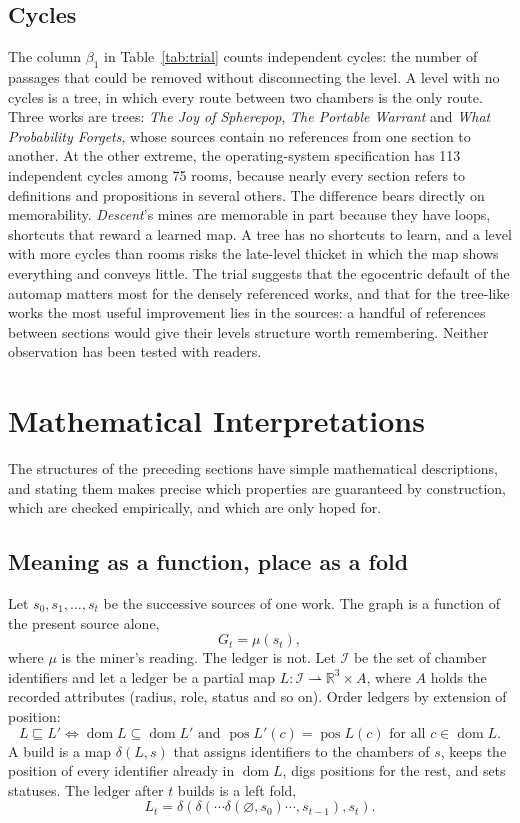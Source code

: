 \documentclass[11pt]{article}
\theoremstyle{remark}
\begin{document}
\subsection{Cycles}

The column $\beta_1$ in Table~\ref{tab:trial} counts independent cycles: the number of passages that could be removed without disconnecting the level. A level with no cycles is a tree, in which every route between two chambers is the only route. Three works are trees: \emph{The Joy of Spherepop}, \emph{The Portable Warrant} and \emph{What Probability Forgets}, whose sources contain no references from one section to another. At the other extreme, the operating-system specification has 113 independent cycles among 75 rooms, because nearly every section refers to definitions and propositions in several others. The difference bears directly on memorability. \emph{Descent}'s mines are memorable in part because they have loops, shortcuts that reward a learned map. A tree has no shortcuts to learn, and a level with more cycles than rooms risks the late-level thicket in which the map shows everything and conveys little. The trial suggests that the egocentric default of the automap matters most for the densely referenced works, and that for the tree-like works the most useful improvement lies in the sources: a handful of references between sections would give their levels structure worth remembering. Neither observation has been tested with readers.

\section{Mathematical Interpretations}
\label{sec:math}

The structures of the preceding sections have simple mathematical descriptions, and stating them makes precise which properties are guaranteed by construction, which are checked empirically, and which are only hoped for.

\subsection{Meaning as a function, place as a fold}

Let $s_0, s_1, \dots, s_t$ be the successive sources of one work. The graph is a function of the present source alone,
\[
G_t = \mu(s_t),
\]
where $\mu$ is the miner's reading. The ledger is not. Let $\mathcal{I}$ be the set of chamber identifiers and let a ledger be a partial map $L : \mathcal{I} \rightharpoonup \mathbb{R}^3 \times A$, where $A$ holds the recorded attributes (radius, role, status and so on). Order ledgers by extension of position:
\[
L \sqsubseteq L' \iff \operatorname{dom} L \subseteq \operatorname{dom} L' \text{ and } \operatorname{pos} L'(c) = \operatorname{pos} L(c) \text{ for all } c \in \operatorname{dom} L.
\]
A build is a map $\delta(L, s)$ that assigns identifiers to the chambers of $s$, keeps the position of every identifier already in $\operatorname{dom} L$, digs positions for the rest, and sets statuses. The ledger after $t$ builds is a left fold,
\[
L_t = \delta(\delta(\cdots\delta(\varnothing, s_0)\cdots, s_{t-1}), s_t).
\]
\end{document}
